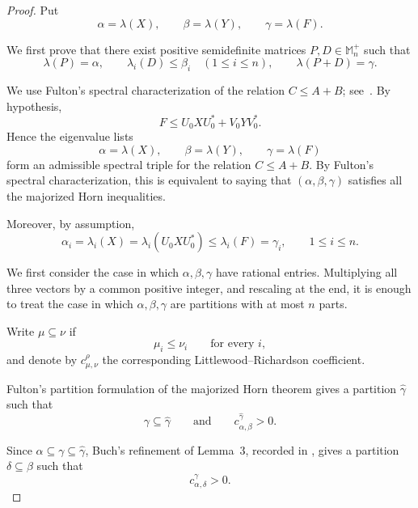 \documentclass[11pt]{amsart}
\numberwithin{equation}{section}
\newcommand{\Mnp}{\mathbb M_n^+}
\begin{document}
\begin{proof}

Put
\[
    \alpha=\lambda(X),\qquad
    \beta=\lambda(Y),\qquad
    \gamma=\lambda(F).
\]

We first prove that there exist positive semidefinite matrices
\(P,D\in\Mnp\) such that
\begin{equation}\label{eq:spectral-completion-revised}
    \lambda(P)=\alpha,\qquad
    \lambda_i(D)\leq\beta_i\quad(1\leq i\leq n),
    \qquad
    \lambda(P+D)=\gamma.
\end{equation}

We use Fulton's spectral characterization of the relation
\(C\leq A+B\); see~\cite[Theorem~1]{Fulton}.
By hypothesis,
\[
    F\leq U_0 X U_0^*+V_0 Y V_0^*.
\]
Hence the eigenvalue lists
\[
    \alpha=\lambda(X),\qquad
    \beta=\lambda(Y),\qquad
    \gamma=\lambda(F)
\]
form an admissible spectral triple for the relation \(C\leq A+B\).
By Fulton's spectral characterization, this is equivalent to saying
that \((\alpha,\beta,\gamma)\) satisfies all the majorized Horn
inequalities.



Moreover, by assumption,
\begin{equation}\label{eq:alpha-gamma}
    \alpha_i
    =\lambda_i(X)
    =\lambda_i(U_0 X U_0^*)
    \leq \lambda_i(F)
    =\gamma_i,
    \qquad 1\leq i\leq n.
\end{equation}

We first consider the case in which
\(\alpha,\beta,\gamma\) have rational entries. Multiplying all three
vectors by a common positive integer, and rescaling at the end, it is
enough to treat the case in which \(\alpha,\beta,\gamma\) are
partitions with at most \(n\) parts.

Write \(\mu\subseteq\nu\) if
\[
    \mu_i\leq\nu_i
    \qquad\text{for every }i,
\]
and denote by \(c_{\mu,\nu}^{\rho}\) the corresponding
Littlewood--Richardson coefficient.

Fulton's partition formulation of the majorized Horn theorem
\cite[Theorem~5 and the following remark]{Fulton} gives a partition
\(\widehat{\gamma}\) such that
\[
    \gamma\subseteq\widehat{\gamma}
    \qquad\text{and}\qquad
    c_{\alpha,\beta}^{\widehat{\gamma}}>0.
\]

Since $\alpha\subseteq\gamma\subseteq\widehat{\gamma}$,
Buch's refinement of Lemma~3, recorded in
\cite[footnote~2]{Fulton}, gives a partition
$\delta\subseteq\beta$ such that
\begin{equation}\label{eq:LR-refinement}
 c_{\alpha,\delta}^{\gamma}>0.
\end{equation}


\end{proof}
\end{document}
